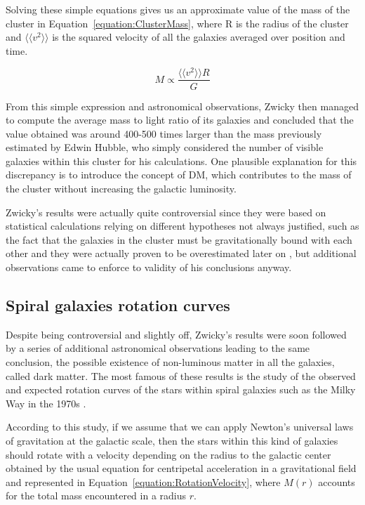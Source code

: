 \documentclass[a4paper, 10pt, openright]{report}
\begin{document}
Solving these simple equations gives us an approximate value of the mass of the cluster in Equation~\ref{equation:ClusterMass}, where R is the radius of the cluster and $\langle \langle v^2 \rangle \rangle$ is the squared velocity of all the galaxies averaged over position and time.

\begin{equation} \label{equation:ClusterMass}
M \propto \frac{\langle \langle v^2 \rangle \rangle R}{G}
\end{equation} 

From this simple expression and astronomical observations, Zwicky then managed to compute the average mass to light ratio of its galaxies and concluded that the value obtained was around 400-500 times larger than the mass previously estimated by Edwin Hubble, who simply considered the number of visible galaxies within this cluster for his calculations. One plausible explanation for this discrepancy is to introduce the concept of \ac{DM}, which contributes to the mass of the cluster without increasing the galactic luminosity.

Zwicky's results were actually quite controversial since they were based on statistical calculations relying on different hypotheses not always justified, such as the fact that the galaxies in the cluster must be gravitationally bound with each other and they were actually proven to be overestimated later on \cite{ZwickyWrong}, but additional observations came to enforce to validity of his conclusions anyway.

\subsection{Spiral galaxies rotation curves}

Despite being controversial and slightly off, Zwicky's results were soon followed by a series of additional astronomical observations leading to the same conclusion, the possible existence of non-luminous matter in all the galaxies, called dark matter. The most famous of these results is the study of the observed and expected rotation curves of the stars within spiral galaxies such as the Milky Way in the 1970s \cite{RotationCurves}. 

According to this study, if we assume that we can apply Newton's universal laws of gravitation at the galactic scale, then the stars within this kind of galaxies should rotate with a velocity depending on the radius to the galactic center obtained by the usual equation for centripetal acceleration in a gravitational field and represented in Equation~\ref{equation:RotationVelocity}, where $M(r)$ accounts for the total mass encountered in a radius $r$.
\end{document}
